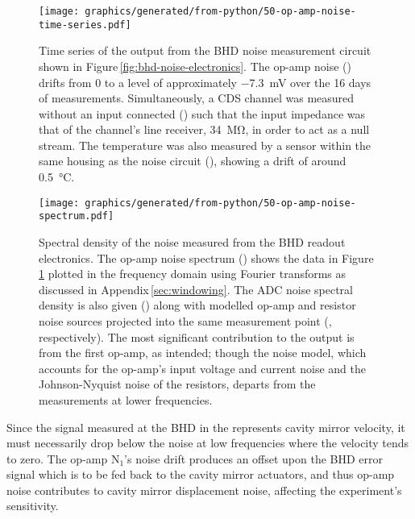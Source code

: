 \begin{figure}
  \centering
  \texttt{[image: graphics/generated/from-python/50-op-amp-noise-time-series.pdf]}
  \caption[Time series of the noise measured from the balanced homodyne readout electronics]{\label{fig:op-amp-noise-time-series}Time series of the output from the BHD noise measurement circuit shown in Figure\,\ref{fig:bhd-noise-electronics}. The op-amp noise () drifts from \num{0} to a level of approximately \SI{-7.3}{\milli\volt} over the 16 days of measurements. Simultaneously, a \gls{CDS} channel was measured without an input connected () such that the input impedance was that of the channel's line receiver, \SI{34}{\mega\ohm}, in order to act as a null stream. The temperature was also measured by a sensor within the same housing as the noise circuit (), showing a drift of around \SI{0.5}{\celsius}.}
\end{figure}

\begin{figure}
  \centering
  \texttt{[image: graphics/generated/from-python/50-op-amp-noise-spectrum.pdf]}
  \caption[Spectral density of the noise measured from the balanced homodyne readout electronics]{\label{fig:op-amp-noise-spectrum}Spectral density of the noise measured from the BHD readout electronics. The op-amp noise spectrum () shows the data in Figure\,\ref{fig:op-amp-noise-time-series} plotted in the frequency domain using Fourier transforms as discussed in Appendix\,\ref{sec:windowing}. The ADC noise spectral density is also given () along with modelled op-amp and resistor noise sources projected into the same measurement point (, respectively). The most significant contribution to the output is from the first op-amp, as intended; though the noise model, which accounts for the op-amp's input voltage and current noise and the Johnson-Nyquist noise of the resistors, departs from the measurements at lower frequencies.}
\end{figure}

Since the signal measured at the \gls{BHD} in the \SSMEXPT{} represents cavity mirror velocity, it must necessarily drop below the noise at low frequencies where the velocity tends to zero. The op-amp $\textrm{N}_{1}$'s noise drift produces an offset upon the \gls{BHD} error signal which is to be fed back to the cavity mirror actuators, and thus op-amp noise contributes to cavity mirror displacement noise, affecting the experiment's sensitivity.

